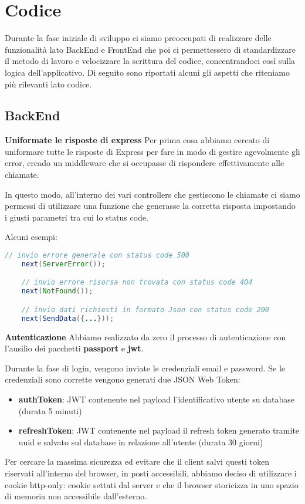 \section{Codice}
Durante la fase iniziale di sviluppo ci siamo preoccupati di realizzare delle funzionalità lato BackEnd e FrontEnd 
che poi ci permettessero di standardizzare il metodo di lavoro e velocizzare la scrittura del codice,
concentrandoci così sulla logica dell'applicativo.
\bigbreak
\noindent
Di seguito sono riportati alcuni gli aspetti che riteniamo più rilevanti lato codice.

\subsection{BackEnd}

\textbf{Uniformate le risposte di express}
\bigbreak
\noindent
Per prima cosa abbiamo cercato di uniformare tutte le risposte di Express per fare in modo di gestire agevolmente gli error, 
creado un middleware che si occupasse di rispondere effettivamente alle chiamate.

In questo modo, all'interno dei vari controllers che gestiscono le chiamate ci siamo permessi di utilizzare una funzione 
che generasse la corretta risposta impostando i giusti parametri tra cui lo status code.

Alcuni esempi:

\begin{lstlisting}[language=java]
	// invio errore generale con status code 500
	next(ServerError()); 

	// invio errore risorsa non trovata con status code 404
	next(NotFound());

	// invio dati richiesti in formato Json con status code 200
	next(SendData({...}));
\end{lstlisting}

\bigbreak
\noindent
\textbf{Autenticazione}
\bigbreak
\noindent
Abbiamo realizzato da zero il processo di autenticazione con l'ausilio dei pacchetti \textbf{passport} e \textbf{jwt}.

Durante la fase di login, vengono inviate le credenziali email e password.
Se le credenziali sono corrette vengono generati due JSON Web Token:
\begin{itemize}
	\item \textbf{authToken}: JWT contenente nel payload l'identificativo utente su database (durata 5 minuti)
	\item \textbf{refreshToken}: JWT contenente nel payload il refresh token generato tramite uuid e salvato sul database in relazione all'utente (durata 30 giorni)
\end{itemize}
Per cercare la massima sicurezza ed evitare che il client salvi questi token riservati all'interno del browser, in posti accessibili, 
abbiamo deciso di utilizzare i cookie http-only: cookie settati dal server e che il browser storicizza in uno spazio di memoria non accessibile dall'esterno.

